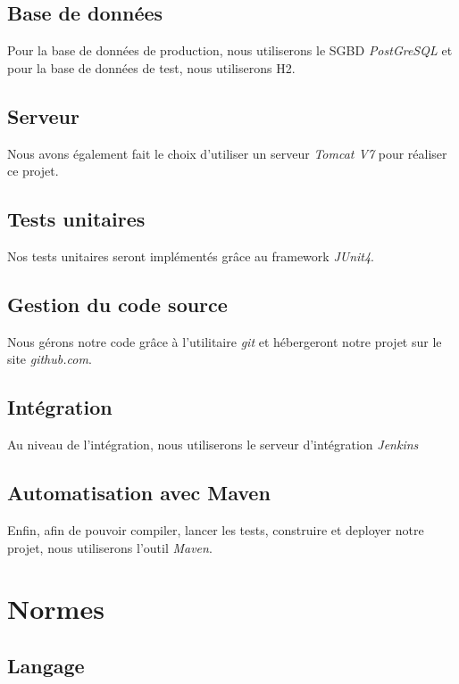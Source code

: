 \documentclass[11pt]{article}
\begin{document}
\subsection{Base de données}

Pour la base de données de production, nous utiliserons le SGBD \emph{PostGreSQL} et pour la base de données de test, nous utiliserons H2.

\subsection{Serveur}

Nous avons également fait le choix d'utiliser un serveur \emph{Tomcat V7} pour réaliser ce projet.

\subsection{Tests unitaires}

Nos tests unitaires seront implémentés grâce au framework \emph{JUnit4}.

\subsection{Gestion du code source}

Nous gérons notre code grâce à l'utilitaire \emph{git} et hébergeront notre projet sur le site \emph{github.com}.

\subsection{Intégration}

Au niveau de l'intégration, nous utiliserons le serveur d'intégration \emph{Jenkins}

\subsection{Automatisation avec Maven}

Enfin, afin de pouvoir compiler, lancer les tests, construire et deployer notre projet, nous utiliserons l'outil \emph{Maven}.

\section{Normes}

\subsection{Langage}
\end{document}
